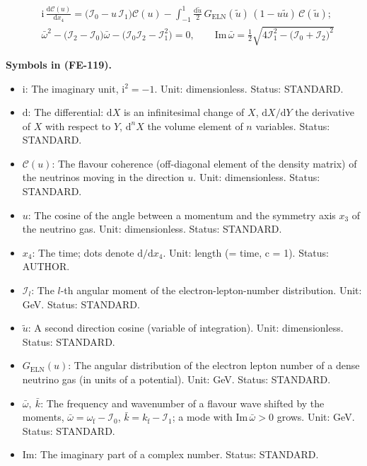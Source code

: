 \documentclass[
  10pt,
]{article}
\providecommand{\tightlist}{%
  \setlength{\itemsep}{0pt}\setlength{\parskip}{0pt}}
\begin{document}
\[
\begin{aligned}
&\mathrm{i}\,\frac{\mathrm{d}\mathcal{C}(u)}{\mathrm{d}x_4} = \big(\mathcal{I}_0 -
 u\,\mathcal{I}_1\big)\mathcal{C}(u)
 - \int_{-1}^{1}\frac{\mathrm{d}\tilde u}{2}\,G_{\mathrm{ELN}}(\tilde u)\,(1 - u\tilde
 u)\,\mathcal{C}(\tilde u);\\
&\bar\omega^2 - \big(\mathcal{I}_2 - \mathcal{I}_0\big)\bar\omega - \big(\mathcal{I}_0\mathcal{I}_2 -
 \mathcal{I}_1^2\big) = 0,\qquad
 \mathrm{Im}\,\bar\omega = \frac12\sqrt{4\mathcal{I}_1^2 - \big(\mathcal{I}_0 + \mathcal{I}_2\big)^2}
\end{aligned} \tag{FE-119}
\]

\textbf{Symbols in (FE-119).}

\begin{itemize}
\tightlist
\item
  \(\mathrm{i}\): The imaginary unit, \(\mathrm{i}^2 = -1\). Unit:
  dimensionless. Status: STANDARD.
\item
  \(\mathrm{d}\): The differential: \(\mathrm{d}X\) is an infinitesimal
  change of \(X\), \(\mathrm{d}X/\mathrm{d}Y\) the derivative of \(X\)
  with respect to \(Y\), \(\mathrm{d}^nX\) the volume element of \(n\)
  variables. Status: STANDARD.
\item
  \(\mathcal{C}(u)\): The flavour coherence (off-diagonal element of the
  density matrix) of the neutrinos moving in the direction \(u\). Unit:
  dimensionless. Status: STANDARD.
\item
  \(u\): The cosine of the angle between a momentum and the symmetry
  axis \(x_3\) of the neutrino gas. Unit: dimensionless. Status:
  STANDARD.
\item
  \(x_4\): The time; dots denote \(\mathrm{d}/\mathrm{d}x_4\). Unit:
  length (= time, c = 1). Status: AUTHOR.
\item
  \(\mathcal{I}_l\): The \(l\)-th angular moment of the
  electron-lepton-number distribution. Unit: GeV. Status: STANDARD.
\item
  \(\tilde u\): A second direction cosine (variable of integration).
  Unit: dimensionless. Status: STANDARD.
\item
  \(G_{\mathrm{ELN}}(u)\): The angular distribution of the electron
  lepton number of a dense neutrino gas (in units of a potential). Unit:
  GeV. Status: STANDARD.
\item
  \(\bar\omega,\ \bar k\): The frequency and wavenumber of a flavour
  wave shifted by the moments,
  \(\bar\omega = \omega_{\mathrm{f}} - \mathcal{I}_0\),
  \(\bar k = k_{\mathrm{f}} - \mathcal{I}_1\); a mode with
  \(\mathrm{Im}\,\bar\omega > 0\) grows. Unit: GeV. Status: STANDARD.
\item
  \(\mathrm{Im}\): The imaginary part of a complex number. Status:
  STANDARD.
\end{itemize}
\end{document}

